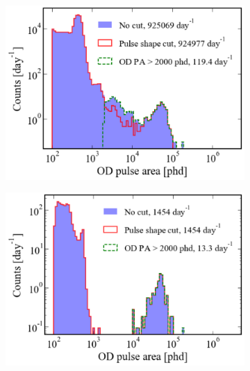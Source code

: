 \begin{figure}[htbp]
    \centering
    \begin{subfigure}{0.49\textwidth}
    \includegraphics[width=\textwidth]{figures/Muons/OD_cuts_pre_coincidenceLZstyle.pdf}
    \caption{}
    \label{fig:Muons/ODcut_pre}
    \end{subfigure}
    \begin{subfigure}{0.49\textwidth}
    \centering
    \includegraphics[width=\textwidth]{figures/Muons/OD_cuts_post_coincidenceLZstyle.pdf}
    \caption{}
    \label{fig:Muons/ODcut_post}
    \end{subfigure}
    \caption{%
}
\end{figure}
